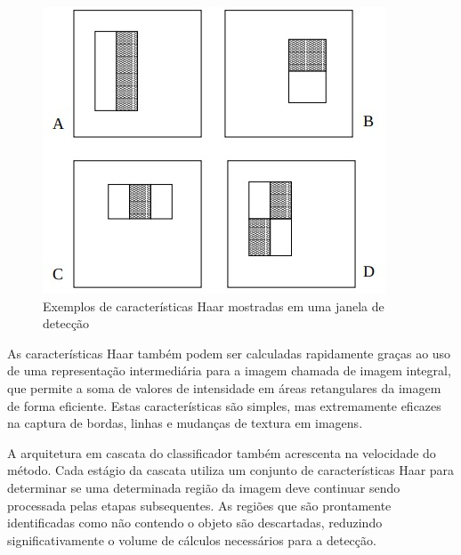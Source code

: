 \documentclass[12pt, %
openright, 
oneside, %
a4paper,    %
brazil]{facom-ufu-abntex2}
\begin{document}

\begin{figure}[!ht]
	\centering
	\includegraphics[width=0.7\linewidth]{haar_features.jpeg}
	\caption[Exemplos de características Haar mostradas em uma janela de detecção]{Exemplos de características Haar mostradas em uma janela de detecção}
	\label{fig:graficosVariandoTamanhoRede}
\end{figure}

As características Haar também podem ser calculadas rapidamente graças ao uso
de uma representação intermediária para a imagem chamada de imagem integral,
que permite a soma de valores de intensidade em áreas retangulares da imagem de
forma eficiente. Estas características são simples, mas extremamente eficazes
na captura de bordas, linhas e mudanças de textura em imagens.

A arquitetura em cascata do classificador também acrescenta na velocidade do
método. Cada estágio da cascata utiliza um conjunto de características Haar
para determinar se uma determinada região da imagem deve continuar sendo
processada pelas etapas subsequentes. As regiões que são prontamente
identificadas como não contendo o objeto são descartadas, reduzindo
significativamente o volume de cálculos necessários para a detecção.
\end{document}
